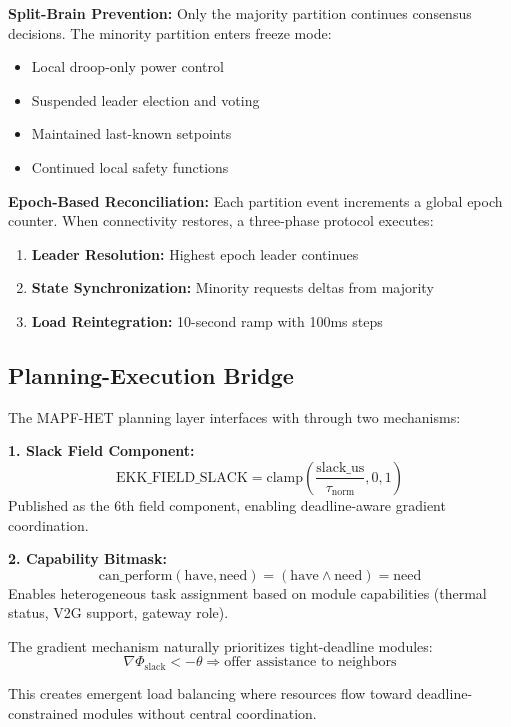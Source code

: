 \textbf{Split-Brain Prevention:} Only the majority partition continues consensus decisions. The minority partition enters freeze mode:
\begin{itemize}
    \item Local droop-only power control
    \item Suspended leader election and voting
    \item Maintained last-known setpoints
    \item Continued local safety functions
\end{itemize}

\textbf{Epoch-Based Reconciliation:} Each partition event increments a global epoch counter. When connectivity restores, a three-phase protocol executes:
\begin{enumerate}
    \item \textbf{Leader Resolution:} Highest epoch leader continues
    \item \textbf{State Synchronization:} Minority requests deltas from majority
    \item \textbf{Load Reintegration:} 10-second ramp with 100ms steps
\end{enumerate}

\subsection{Planning-Execution Bridge}

The MAPF-HET planning layer interfaces with \ekkor{} through two mechanisms:

\textbf{1. Slack Field Component:}
\begin{equation}
\text{EKK\_FIELD\_SLACK} = \text{clamp}\left(\frac{\text{slack\_us}}{\tau_{\text{norm}}}, 0, 1\right)
\end{equation}
Published as the 6th field component, enabling deadline-aware gradient coordination.

\textbf{2. Capability Bitmask:}
\begin{equation}
\text{can\_perform}(\text{have}, \text{need}) = (\text{have} \land \text{need}) = \text{need}
\end{equation}
Enables heterogeneous task assignment based on module capabilities (thermal status, V2G support, gateway role).

The gradient mechanism naturally prioritizes tight-deadline modules:
\begin{equation}
\nabla\Phi_{\text{slack}} < -\theta \Rightarrow \text{offer assistance to neighbors}
\end{equation}

This creates emergent load balancing where resources flow toward deadline-constrained modules without central coordination.
